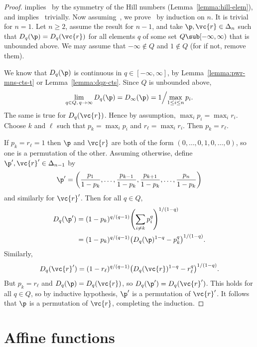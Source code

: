 \begin{proof}
 implies~ by the symmetry of
the Hill numbers (Lemma~\ref{lemma:hill-elem}), and
 implies~ trivially.  Now
assuming~, we prove~
by induction on $n$.  It is trivial for $n = 1$.  Let $n
\geq 2$, assume the result for $n - 1$, and take $\p, \vc{r} \in \Delta_n$
such that $D_q(\p) = D_q(\vc{r})$ for all elements $q$ of some set $Q \sub
[-\infty, \infty)$ that is unbounded above.  We may assume that $-\infty
  \not\in Q$ and $1 \not\in Q$ (for if not, remove them).

We know that $D_q(\p)$ is continuous in $q \in [-\infty, \infty]$, by
Lemma~\ref{lemma:pwr-mns-cts-t} or
Lemma~\ref{lemma:dqz-cts}.  Since $Q$ is unbounded
above,
\[
\lim_{q \in Q, \, q \to \infty} D_q(\p) 
= 
D_\infty(\p)
=
1\Big/\!\max_{1 \leq i \leq n} p_i.
\]
The same is true for $D_q(\vc{r})$.  Hence by assumption,
$\max_i p_i = \max_i r_i$.  Choose $k$ and $\ell$ such that $p_k = \max_i
p_i$ and $r_\ell = \max_i r_i$.  Then $p_k = r_\ell$.

If $p_k = r_\ell = 1$ then $\p$ and $\vc{r}$ are both of the form $(0,
\ldots, 0, 1, 0, \ldots, 0)$, so one is a permutation of the other.
Assuming otherwise, define $\p', \vc{r}' \in \Delta_{n - 1}$ by
\[
\p' 
= 
\biggl( 
\frac{p_1}{1 - p_k}, \ldots, \frac{p_{k - 1}}{1 - p_k},
\frac{p_{k + 1}}{1 - p_k}, \ldots, \frac{p_n}{1 - p_k} \biggr)
\]
and similarly for $\vc{r}'$.  Then for all $q \in Q$,
% 
\begin{align*}
D_q(\p')        &
=
(1 - p_k)^{q/(q - 1)} 
\Biggl( \sum_{i \neq k} p_i^q \Biggr)^{1/(1 - q)}  \\
&
=
(1 - p_k)^{q/(q - 1)} 
\bigl( D_q(\p)^{1 - q} - p_k^q \bigr)^{1/(1 - q)}.
\end{align*}
% 
Similarly,
\[
D_q(\vc{r}') 
=
(1 - r_\ell)^{q/(q - 1)} 
\bigl( D_q(\vc{r})^{1 - q} - r_\ell^q \bigr)^{1/(1 - q)}.
\]
But $p_k = r_\ell$ and $D_q(\p) = D_q(\vc{r})$, so
$D_q(\p') = D_q(\vc{r}')$.  This holds for all $q \in Q$, so by inductive
hypothesis, $\p'$ is a permutation of $\vc{r}'$.  It follows that $\p$ is a
permutation of $\vc{r}$, completing the induction.
\end{proof}


\section{Affine functions}


